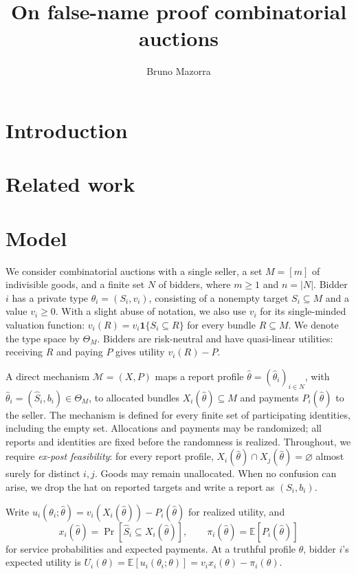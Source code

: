 \documentclass[format=acmsmall, review=false]{acmart}
\title{On false-name proof combinatorial auctions}
\author{Bruno Mazorra}
\theoremstyle{acmdefinition}%
\begin{document}
\begin{titlepage}
\maketitle

\end{titlepage}
\section{Introduction}
\section{Related work}
\section{Model}
\label{sec:model}

We consider combinatorial auctions with a single seller, a set
$M=[m]$ of indivisible goods, and a finite set $N$ of bidders,
where $m\ge1$ and $n=|N|$. Bidder $i$ has a private type
$\theta_i=(S_i,v_i)$, consisting of a nonempty target
$S_i\subseteq M$ and a value $v_i\ge0$. With a slight abuse of
notation, we also use $v_i$ for its single-minded valuation
function: $v_i(R)=v_i\mathbf{1}\{S_i\subseteq R\}$ for every
bundle $R\subseteq M$. We denote the type space by $\Theta_M$.
Bidders are risk-neutral and have quasi-linear utilities:
receiving $R$ and paying $P$ gives utility $v_i(R)-P$.


A direct mechanism $\mathcal M=(X,P)$ maps a report profile
$\hat\theta=(\hat\theta_i)_{i\in N}$, with
$\hat\theta_i=(\hat S_i,b_i)\in\Theta_M$, to allocated bundles
$X_i(\hat\theta)\subseteq M$ and payments $P_i(\hat\theta)$
to the seller. The mechanism is defined for every finite set of
participating identities, including the empty set. Allocations
and payments may be randomized; all reports and identities are
fixed before the randomness is realized. Throughout, we require
\emph{ex-post feasibility}: for every report profile,
$X_i(\hat\theta)\cap X_j(\hat\theta)=\varnothing$ almost surely
for distinct $i,j$. Goods may remain unallocated. When no
confusion can arise, we drop the hat on reported targets and
write a report as $(S_i,b_i)$.

Write $u_i(\theta_i;\hat\theta)
=v_i(X_i(\hat\theta))-P_i(\hat\theta)$ for realized utility, and
\[
x_i(\hat\theta)
=\Pr[\hat S_i\subseteq X_i(\hat\theta)],
\qquad
\pi_i(\hat\theta)=\mathbb{E}[P_i(\hat\theta)]
\]
for service probabilities and expected payments. At a truthful
profile $\theta$, bidder $i$'s expected utility is
$U_i(\theta)=\mathbb{E}[u_i(\theta_i;\theta)]
=v_i x_i(\theta)-\pi_i(\theta)$.
\end{document}
